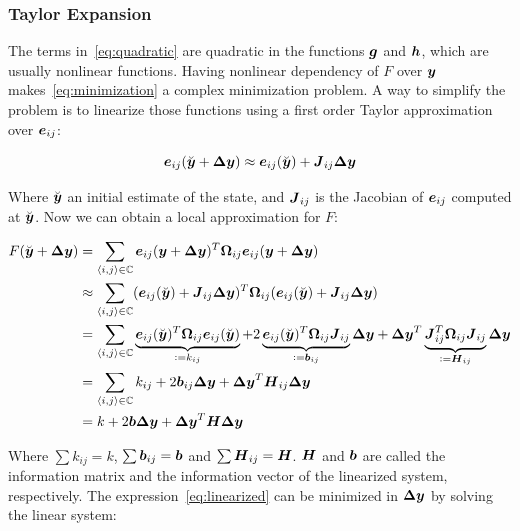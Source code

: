 \subsubsection{Taylor Expansion}

The terms in~\eqref{eq:quadratic} are quadratic in the functions $\boldsymbol{g}$ and $\boldsymbol{h}$, which are usually nonlinear functions. Having nonlinear dependency of $F$ over $\boldsymbol{y}$ makes~\eqref{eq:minimization} a complex minimization problem. A way to simplify the problem is to linearize those functions using a first order Taylor approximation over $\boldsymbol{e}_{ij}$:

\begin{equation}
\boldsymbol{e}_{ij}(\breve{\boldsymbol{y}}+\boldsymbol{\Delta y}) \approx \boldsymbol{e}_{ij}(\breve{\boldsymbol{y}}) + \boldsymbol{J}_{ij}\boldsymbol{\Delta y}
\end{equation}

Where $\breve{\boldsymbol{y}}$ an initial estimate of the state, and $\boldsymbol{J}_{ij}$ is the Jacobian of $\boldsymbol{e}_{ij}$ computed at $\breve{\boldsymbol{y}}$. Now we can obtain a local approximation for $F$:

\begin{align}
F(\breve{\boldsymbol{y}}+\boldsymbol{\Delta y}) &= \sum_{\left<i,j\right>\in\mathbb{C}}
\boldsymbol{e}_{ij}(\boldsymbol{y}+\boldsymbol{\Delta y})^T\boldsymbol{\Omega}_{ij} 
\boldsymbol{e}_{ij}(\boldsymbol{y}+\boldsymbol{\Delta y}) \notag \\
& \approx \sum_{\left<i,j\right>\in\mathbb{C}} 
(\boldsymbol{e}_{ij}(\breve{\boldsymbol{y}}) + \boldsymbol{J}_{ij}\boldsymbol{\Delta y})^T \boldsymbol{\Omega}_{ij}
(\boldsymbol{e}_{ij}(\breve{\boldsymbol{y}}) + \boldsymbol{J}_{ij}\boldsymbol{\Delta y})\notag \\
&= \sum_{\left<i,j\right>\in\mathbb{C}}
\underbrace{\boldsymbol{e}_{ij}(\breve{\boldsymbol{y}})^T\boldsymbol{\Omega}_{ij}\boldsymbol{e}_{ij}(\breve{\boldsymbol{y}})}_{\vcentcolon= k_{ij}}
+2\underbrace{\boldsymbol{e}_{ij}(\breve{\boldsymbol{y}})^T\boldsymbol{\Omega}_{ij}\boldsymbol{J}_{ij}}_{ \vcentcolon= \boldsymbol{b}_{ij}}\boldsymbol{\Delta y}
+\boldsymbol{\Delta y}^T
\underbrace{\boldsymbol{J}_{ij}^T\boldsymbol{\Omega}_{ij}\boldsymbol{J}_{ij}}_{\vcentcolon= \boldsymbol{H}_{ij}}
\boldsymbol{\Delta y} \notag \\
&= \sum_{\left<i,j\right>\in\mathbb{C}} k_{ij} + 2\boldsymbol{b}_{ij}\boldsymbol{\Delta y} + \boldsymbol{\Delta y}^T \boldsymbol{H}_{ij} \boldsymbol{\Delta y} \notag \\
&= k + 2\boldsymbol{b} \boldsymbol{\Delta y} + \boldsymbol{\Delta y}^T \boldsymbol{H} \boldsymbol{\Delta y}
\label{eq:linearized}
\end{align}

Where $\sum k_{ij} = k$, $\sum \boldsymbol{b}_{ij} = \boldsymbol{b}$ and $\sum \boldsymbol{H}_{ij} = \boldsymbol{H}$. $\boldsymbol{H}$ and $\boldsymbol{b}$ are called the information matrix and the information vector of the linearized system, respectively. The expression~\eqref{eq:linearized} can be minimized in $\boldsymbol{\Delta y}$ by solving the linear system:

